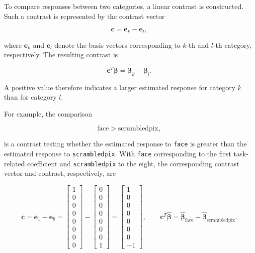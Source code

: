 \documentclass[english]{pwr_wmat_praca_dyplomowa}
\theoremstyle{definition}
\theoremstyle{remark}
\begin{document}
To compare responses between two categories, a linear contrast is constructed. Such a contrast is represented by the contrast vector 

\begin{equation}
    \mathbf{c} = \mathbf{e}_k - \mathbf{e}_l,
\end{equation}

where $\mathbf{e}_k$ and $\mathbf{e}_l$ denote the basis vectors corresponding to $k$-th and $l$-th category, respectively. The resulting contrast is

\begin{equation}
    \mathbf{c}^T\boldsymbol{\beta} = \boldsymbol{\beta}_k - \boldsymbol{\beta}_l.
\end{equation}

A positive value therefore indicates a larger estimated response for category $k$ than for category $l$. 

For example, the comparison

\begin{equation}
    \text{face} > \text{scrambledpix},
\end{equation}

is a contrast testing whether the estimated response to \verb|face| is greater than the estimated response to \verb|scrambledpix|. With \verb|face| corresponding to the first task-related coefficient and \verb|scrambledpix| to the eight, the corresponding contrast vector and contrast, respectively, are

\begin{equation}
    \mathbf{c} = \mathbf{e}_1 - \mathbf{e}_8 
    = \begin{bmatrix} 1 \\ 0 \\ 0 \\ 0 \\ 0 \\ 0 \\ 0 \\ 0 \end{bmatrix} - \begin{bmatrix} 0 \\ 0 \\ 0 \\ 0 \\ 0 \\ 0 \\ 0 \\ 1 \end{bmatrix}
    = \begin{bmatrix} 1 \\ 0 \\ 0 \\ 0 \\ 0 \\ 0 \\ 0 \\ -1 \end{bmatrix}
    , \qquad 
    \mathbf{c}^T\widehat{\boldsymbol{\beta}} = \widehat{\boldsymbol{\beta}}_{\mathrm{face}} - \widehat{\boldsymbol{\beta}}_{\mathrm{scrambledpix}}.
\end{equation}
\end{document}
